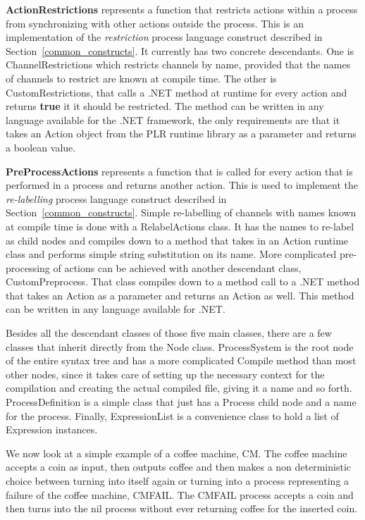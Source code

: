  	\textbf{ActionRestrictions} represents a function that restricts actions 
 	within a process from synchronizing with other actions outside the process. 
 	This is an implementation of the \textit{restriction} process language 
 	construct described in Section~\ref{common_constructs}. It currently has two 
 	concrete descendants. One is \textsf{ChannelRestrictions} which restricts 
 	channels by name, provided that the names of channels to restrict are known 
 	at compile time. The other is \textsf{CustomRestrictions}, that calls a .NET 
 	method at runtime for every action and returns \textbf{true} it it should be 
 	restricted. The method can be written in any language available for the .NET 
 	framework, the only requirements are that it takes an \textsf{Action} object 
 	from the PLR runtime library as a parameter and returns a boolean value.
	 
 	\textbf{PreProcessActions} represents a function that is called for every 
 	action that is performed in a process and returns another action. This is 
 	used to implement the \textit{re-labelling} process language construct 
 	described in Section~\ref{common_constructs}. Simple re-labelling of 
 	channels with names known at compile time is done with a 
 	\textsf{RelabelActions} class. It has the names to re-label as child nodes 
 	and compiles down to a method that takes in an \textsf{Action} runtime class 
 	and performs simple string substitution on its name. More complicated 
 	pre-processing of actions can be achieved with another descendant class, 
 	\textsf{CustomPreprocess}. That class compiles down to a method call to a 
 	.NET method that takes an \textsf{Action} as a parameter and returns an 
 	\textsf{Action} as well. This method can be written in any language 
 	available for .NET.
 	
 	Besides all the descendant classes of those five main classes, there are a 
 	few classes that inherit directly from the \textsf{Node} class. 
 	\textsf{ProcessSystem} is the root node of the entire syntax tree and has a 
 	more complicated \textsf{Compile} method than most other nodes, since it 
 	takes care of setting up the necessary context for the compilation and 
 	creating the actual compiled file, giving it a name and so forth. 
 	\textsf{ProcessDefinition} is a simple class that just has a 
 	\textsf{Process} child node and a name for the process. Finally, 
 	\textsf{ExpressionList} is a convenience class to hold a list of 
 	\textsf{Expression} instances.
 	
	We now look at a simple example of a coffee machine, CM. The coffee machine 
	accepts a coin as input, then outputs coffee and then makes a non 
	deterministic choice between turning into itself again or turning into a 
	process representing a failure of the coffee machine, CMFAIL. The CMFAIL 
	process accepts a coin and then turns into the nil process without ever
	returning coffee for the inserted coin.


